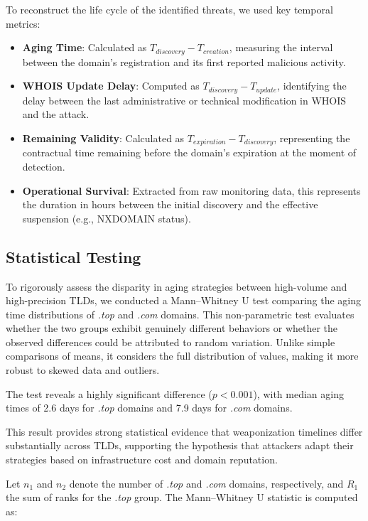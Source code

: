 \documentclass[final, 9pt, twocolumn]{saucis}
\begin{document}
To reconstruct the life cycle of the identified threats, we used key temporal metrics:

\begin{itemize}
    \item \textbf{Aging Time}: Calculated as $T_{discovery} - T_{creation}$, measuring the interval between the domain's registration and its first reported malicious activity.
    \item \textbf{WHOIS Update Delay}: Computed as $T_{discovery} - T_{update}$, identifying the delay between the last administrative or technical modification in WHOIS and the attack.
    \item \textbf{Remaining Validity}: Calculated as $T_{expiration} - T_{discovery}$, representing the contractual time remaining before the domain's expiration at the moment of detection.
    \item \textbf{Operational Survival}: Extracted from raw monitoring data, this represents the duration in hours between the initial discovery and the effective suspension (e.g., NXDOMAIN status).
\end{itemize}

\subsection{Statistical Testing}
To rigorously assess the disparity in aging strategies between high-volume and high-precision TLDs, we conducted a Mann–Whitney U test comparing the aging time distributions of \textit{.top} and \textit{.com} domains. This non-parametric test evaluates whether the two groups exhibit genuinely different behaviors or whether the observed differences could be attributed to random variation. Unlike simple comparisons of means, it considers the full distribution of values, making it more robust to skewed data and outliers.

The test reveals a highly significant difference ($p < 0.001$), with median aging times of 2.6 days for \textit{.top} domains and 7.9 days for \textit{.com} domains.

This result provides strong statistical evidence that weaponization timelines differ substantially across TLDs, supporting the hypothesis that attackers adapt their strategies based on infrastructure cost and domain reputation.

Let $n_1$ and $n_2$ denote the number of \textit{.top} and \textit{.com} domains, respectively, and $R_1$ the sum of ranks for the \textit{.top} group. The Mann–Whitney U statistic is computed as:
\end{document}
